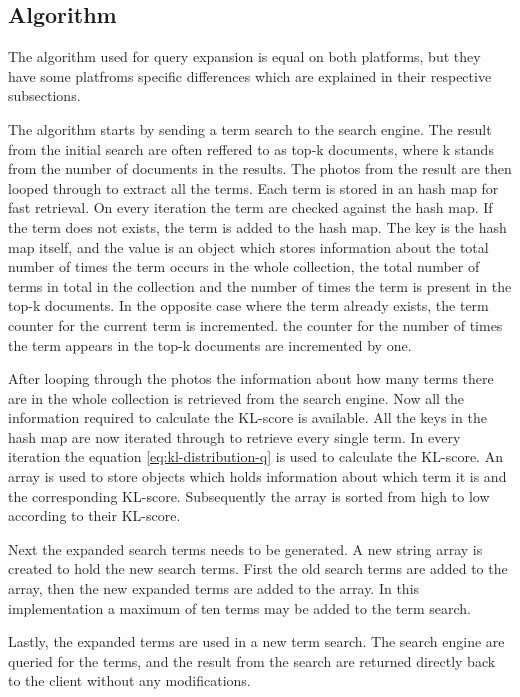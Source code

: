 \subsection{Algorithm}
\label{sec:algorithm}
The algorithm used for query expansion is equal on both platforms,
but they have some platfroms specific differences which are explained in their respective subsections.

The algorithm starts by sending a term search to the search engine.
The result from the initial search are often reffered to as top-k documents,
where k stands from the number of documents in the results.
The photos from the result are then looped through to extract all the terms.
Each term is stored in an hash map for fast retrieval.
On every iteration the term are checked against the hash map.
If the term does not exists,
the term is added to the hash map.
The key is the hash map itself,
and the value is an object which stores information about the total number of times the term occurs in the whole collection,
the total number of terms in total in the collection and the number of times the term is present in the top-k documents.
In the opposite case where the term already exists, the term counter for the current term is incremented.
the counter for the number of times the term appears in the top-k documents are incremented by one.

After looping through the photos the information about how many terms there are in the whole collection is retrieved from the search engine.
Now all the information required to calculate the KL-score is available.
All the keys in the hash map are now iterated through to retrieve every single term.
In every iteration the equation \ref{eq:kl-distribution-q} is used to calculate the KL-score.
An array is used to store objects which holds information about which term it is and the corresponding KL-score.
Subsequently the array is sorted from high to low according to their KL-score.

Next the expanded search terms needs to be generated.
A new string array is created to hold the new search terms.
First the old search terms are added to the array,
then the new expanded terms are added to the array.
In this implementation a maximum of ten terms may be added to the term search.

Lastly, the expanded terms are used in a new term search.
The search engine are queried for the terms,
and the result from the search are returned directly back to the client without any modifications.

